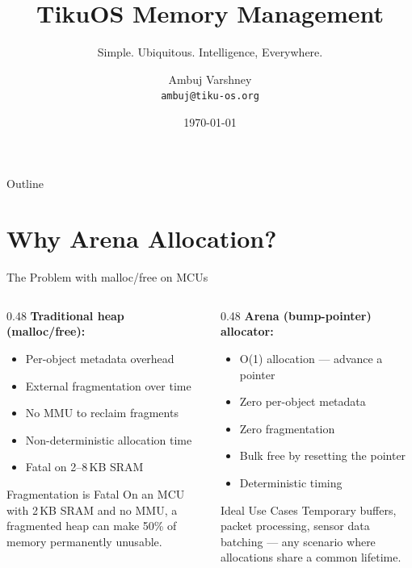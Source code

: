 \documentclass[aspectratio=169, 10pt]{beamer}
\title[TikuOS Memory]{TikuOS Memory Management}
\subtitle{Simple. Ubiquitous. Intelligence, Everywhere.}
\author[Ambuj Varshney]{Ambuj Varshney \\ \texttt{ambuj@tiku-os.org}}
\date{\today}
\begin{document}
\begin{frame}
\titlepage
\end{frame}

\begin{frame}{Outline}
\tableofcontents
\end{frame}

\section{Why Arena Allocation?}

\begin{frame}{The Problem with malloc/free on MCUs}
\begin{columns}[T]
\begin{column}{0.48\textwidth}
\textbf{Traditional heap (malloc/free):}
\begin{itemize}
  \item Per-object metadata overhead
  \item External fragmentation over time
  \item No MMU to reclaim fragments
  \item Non-deterministic allocation time
  \item Fatal on 2--8\,KB SRAM
\end{itemize}

\vspace{0.5em}
\begin{alertblock}{Fragmentation is Fatal}
On an MCU with 2\,KB SRAM and no MMU, a fragmented heap can make
50\% of memory permanently unusable.
\end{alertblock}
\end{column}

\begin{column}{0.48\textwidth}
\textbf{Arena (bump-pointer) allocator:}
\begin{itemize}
  \item O(1) allocation --- advance a pointer
  \item Zero per-object metadata
  \item Zero fragmentation
  \item Bulk free by resetting the pointer
  \item Deterministic timing
\end{itemize}

\vspace{0.5em}
\begin{block}{Ideal Use Cases}
Temporary buffers, packet processing, sensor data batching ---
any scenario where allocations share a common lifetime.
\end{block}
\end{column}
\end{columns}
\end{frame}
\end{document}
